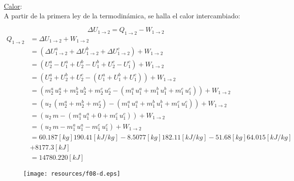 \documentclass[letter,11pt]{article}
\begin{document}
\begin{enumerate}
\underline{Calor}: \\
A partir de la primera ley de la termodinámica, se halla el calor intercambiado:

\begin{equation*}
    \Delta U_{1\rightarrow 2} = Q_{1\rightarrow 2} - W_{1\rightarrow 2}
\end{equation*}
\begin{equation*}
    \begin{split}
        Q_{1\rightarrow 2} &= \Delta U_{1\rightarrow 2} + W_{1\rightarrow 2} \\
                           &= (\Delta U^a_{1\rightarrow 2} 
                              + \Delta U^b_{1\rightarrow 2} 
                              + \Delta U^c_{1\rightarrow 2})
                              + W_{1\rightarrow 2} \\
                           &= (U_2^a - U_1^a + U_2^b - U_1^b + U_2^c - U_1^c)
                              + W_{1\rightarrow 2} \\
                           &= (U_2^a+U_2^b+U_2^c - (U_1^a+U_1^b+U_1^c))
                              + W_{1\rightarrow 2} \\
                           &= (m_2^a\,u_2^a+m_2^b\,u_2^b+m_2^c\,u_2^c
                              - (m_1^a\,u_1^a+m_1^b\,u_1^b+m_1^c\,u_1^c))
                              + W_{1\rightarrow 2} \\
                           &= (u_2\,(m_2^a+m_2^b+m_2^c)
                              - (m_1^a\,u_1^a+m_1^b\,u_1^b+m_1^c\,u_1^c))
                              + W_{1\rightarrow 2} \\
                           &= (u_2\,m-(m_1^a\,u_1^a+0+m_1^c\,u_1^c))
                              + W_{1\rightarrow 2} \\
                           &= (u_2\,m-m_1^a\,u_1^a-m_1^c\,u_1^c)
                              + W_{1\rightarrow 2} \\
                           &= 60.187[kg]190.41[kJ/kg]-8.5077[kg]182.11[kJ/kg]
                              - 51.68[kg]64.015[kJ/kg] \\
                           &+ 8177.3[kJ] \\
                           &= 14780.220[kJ]
    \end{split}
\end{equation*}

\begin{figure}[H]
\centering
\texttt{[image: resources/f08-d.eps]}
\end{figure}


\end{enumerate}
\end{document}
